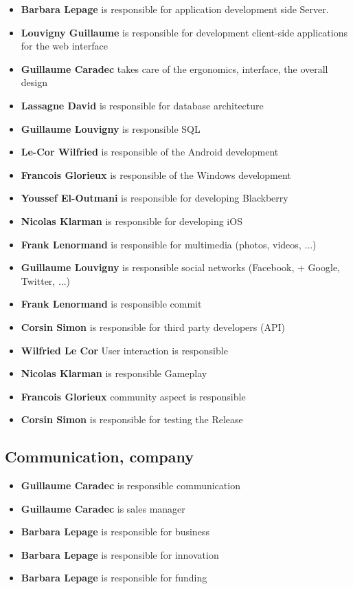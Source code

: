 \documentclass {life-en}
\begin{document}
\begin{itemize}
  \item \textbf{Barbara Lepage} is responsible for application development side
    Server.
  \item \textbf{Louvigny Guillaume} is responsible for development
    client-side applications for the web interface
  \item \textbf{Guillaume Caradec} takes care of the ergonomics, interface, the
    overall design
  \item \textbf{Lassagne David} is responsible for database architecture
  \item \textbf{Guillaume Louvigny} is responsible SQL
  \item \textbf{Le-Cor Wilfried} is responsible of the Android development
  \item \textbf{Francois Glorieux} is responsible of the Windows development
  \item \textbf{Youssef El-Outmani} is responsible for developing Blackberry
  \item \textbf{Nicolas Klarman} is responsible for developing iOS
  \item \textbf{Frank Lenormand} is responsible for multimedia (photos, videos, ...)
  \item \textbf{Guillaume Louvigny} is responsible social networks (Facebook,
    + Google, Twitter, ...)
  \item \textbf{Frank Lenormand} is responsible commit
  \item \textbf{Corsin Simon} is responsible for third party developers (API)
  \item \textbf{Wilfried Le Cor} User interaction is responsible
  \item \textbf{Nicolas Klarman} is responsible Gameplay
  \item \textbf{Francois Glorieux} community aspect is responsible
  \item \textbf{Corsin Simon} is responsible for testing the Release
\end{itemize}

\subsection{Communication, company}

\begin{itemize}
  \item \textbf{Guillaume Caradec} is responsible communication
  \item \textbf{Guillaume Caradec} is sales manager
  \item \textbf{Barbara Lepage} is responsible for business
  \item \textbf{Barbara Lepage} is responsible for innovation
  \item \textbf{Barbara Lepage} is responsible for funding
\end{itemize}
\end{document}
